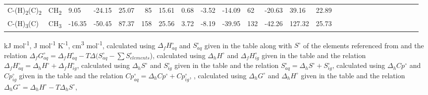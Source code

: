 \begin{landscape}
\begin{table}
\begin{adjustbox}{width=600pt,keepaspectratio}
\begin{threeparttable}
\begin{tabular}{llerererererererererererer}
C-(H)\textsubscript{2}(C)\textsubscript{2} & CH\textsubscript{2} & 9.05 & -24.15 & 25.07 & 85 & 15.61 & 0.68 & -3.52 & -14.09 & 62 & -20.63 & 39.16 & 22.89 \\
C-(H)\textsubscript{3}(C) & CH\textsubscript{3} & -16.35 & -50.45 & 87.37 & 158 & 25.56 & 3.72 & -8.19 & -39.95 & 132 & -42.26 & 127.32 & 25.73 \\
\bottomrule
\end{tabular}%


  
  \begin{tablenotes}
     kJ mol\textsuperscript{-1},
     J mol\textsuperscript{-1} K\textsuperscript{-1},
     cm\textsuperscript{3} mol\textsuperscript{-1},
     calculated using $\Delta_{f}H^{\circ}_{aq}$ and $S^{\circ}_{aq}$ given in the table along with $S^{\circ}$ of the elements referenced from \cite{cox1989codata} and the relation $\Delta_{f}G^{\circ}_{aq} = \Delta_{f}H^{\circ}_{aq} - T\Delta(S_{aq}^{\circ}-\sum S_{elements}^{\circ}$),
     calculated using $\Delta_{h}H^{\circ}$ and $\Delta_{f}H^{\circ}_{ig}$ given in the table and the relation $\Delta_{f}H^{\circ}_{aq} = \Delta_{h}H^{\circ} + \Delta_{f}H^{\circ}_{ig}$,
     calculated using $\Delta_{h}S^{\circ}$ and $S^{\circ}_{ig}$ given in the table and the relation $S^{\circ}_{aq} = \Delta_{h}S^{\circ} + S^{\circ}_{ig}$,
     calculated using $\Delta_{h}Cp^{\circ}$ and $Cp^{\circ}_{ig}$ given in the table and the relation $Cp^{\circ}_{aq} = \Delta_{h}Cp^{\circ} + Cp^{\circ}_{ig}$,
     \cite{plyasunov2004group},
     calculated using $\Delta_{h}G^{\circ}$ and $\Delta_{h}H^{\circ}$ given in the table and the relation $\Delta_{h}G^{\circ} = \Delta_{h}H^{\circ} - T\Delta_{h} S^{\circ}$,
     \cite{domalski1993estimation}
        
  \end{tablenotes}
  
  \label{tab:grpadd}
  \end{threeparttable}
  \end{adjustbox}
\end{table}
\doublespace
\end{landscape}
